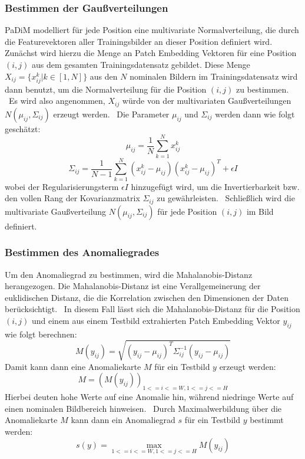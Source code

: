 \subsubsection{Bestimmen der Gaußverteilungen}
PaDiM modelliert für jede Position eine multivariate Normalverteilung, die durch die Featurevektoren aller Trainingsbilder an dieser Position definiert wird. \\
Zunächst wird hierzu die Menge an Patch Embedding Vektoren für eine Position $(i,j)$ aus dem gesamten Trainingsdatensatz gebildet. Diese Menge \
$X_{ij} = \{ {x_{ij}^{k} | k\in [1,N]} \}$ aus den $N$ nominalen Bildern im Trainingsdatensatz wird dann benutzt, um die Normalverteilung für die Position $(i,j)$ zu bestimmen. \
Es wird also angenommen, $X_{ij}$ würde von der multivariaten Gaußverteilungen $N(\mu_{ij}, \Sigma_{ij})$ erzeugt werden. \
Die Parameter $\mu_{ij}$ und $\Sigma_{ij}$ werden dann wie folgt geschätzt: \
$$
\mu_{ij} = \frac{1}{N} \sum_{k=1}^{N} x_{ij}^{k}
$$
$$
\Sigma_{ij} = \frac{1}{N-1} \sum_{k=1}^{N} (x_{ij}^{k} - \mu_{ij})(x_{ij}^{k} - \mu_{ij})^{T} + \epsilon I
$$
wobei der Regularisierungsterm $\epsilon I$ hinzugefügt wird, um die Invertierbarkeit bzw. den vollen Rang der Kovarianzmatrix $\Sigma_{ij}$ zu gewährleisten. \
Schließlich wird die multivariate Gaußverteilung $N(\mu_{ij}, \Sigma_{ij})$ für jede Position $(i,j)$ im Bild definiert.\
\subsubsection{Bestimmen des Anomaliegrades}
Um den Anomaliegrad zu bestimmen, wird die Mahalanobis-Distanz herangezogen.%
Die Mahalanobis-Distanz ist eine Verallgemeinerung der euklidischen Distanz, die die Korrelation zwischen den Dimensionen der Daten berücksichtigt. \
In diesem Fall lässt sich die Mahalanobis-Distanz für die Position $(i,j)$ und einem aus einem Testbild extrahierten Patch Embedding Vektor $y_{ij}$ wie folgt berechnen: \
$$
M(y_{ij}) = \sqrt{(y_{ij} - \mu_{ij})^{T} \Sigma_{ij}^{-1} (y_{ij} - \mu_{ij})}
$$
Damit kann dann eine Anomaliekarte $M$ für ein Testbild $y$ erzeugt werden:
$$
M = (M(y_{ij}))_{1<=i<=W, 1<=j<=H}
$$
Hierbei deuten hohe Werte auf eine Anomalie hin, während niedringe Werte auf einen nominalen Bildbereich hinweisen. \
Durch Maximalwerbildung über die Anomaliekarte $M$ kann dann ein Anomaliegrad $s$ für ein Testbild $y$ bestimmt werden: \
$$
s(y) = \max_{1<=i<=W, 1<=j<=H} M(y_{ij})
$$
